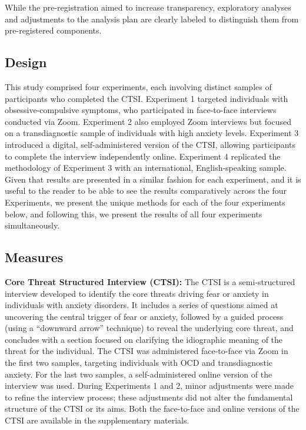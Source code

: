 \documentclass[
  man,floatsintext]{apa7}
\begin{document}
While the pre-registration aimed to increase transparency, exploratory analyses and adjustments to the analysis plan are clearly labeled to distinguish them from pre-registered components.

\subsection{Design}\label{design}

This study comprised four experiments, each involving distinct samples of participants who completed the CTSI.
Experiment 1 targeted individuals with obsessive-compulsive symptoms, who participated in face-to-face interviews conducted via Zoom.
Experiment 2 also employed Zoom interviews but focused on a transdiagnostic sample of individuals with high anxiety levels.
Experiment 3 introduced a digital, self-administered version of the CTSI, allowing participants to complete the interview independently online.
Experiment 4 replicated the methodology of Experiment 3 with an international, English-speaking sample.
Given that results are presented in a similar fashion for each experiment, and it is useful to the reader to be able to see the results comparatively across the four Experiments, we present the unique methods for each of the four experiments below, and following this, we present the results of all four experiments simultaneously.

\subsection{Measures}\label{measures}

\textbf{Core Threat Structured Interview (CTSI):} The CTSI is a semi-structured interview developed to identify the core threats driving fear or anxiety in individuals with anxiety disorders.
It includes a series of questions aimed at uncovering the central trigger of fear or anxiety, followed by a guided process (using a ``downward arrow'' technique) to reveal the underlying core threat, and concludes with a section focused on clarifying the idiographic meaning of the threat for the individual.
The CTSI was administered face-to-face via Zoom in the first two samples, targeting individuals with OCD and transdiagnostic anxiety.
For the last two samples, a self-administered online version of the interview was used.
During Experiments 1 and 2, minor adjustments were made to refine the interview process; these adjustments did not alter the fundamental structure of the CTSI or its aims.
Both the face-to-face and online versions of the CTSI are available in the supplementary materials.
\end{document}
